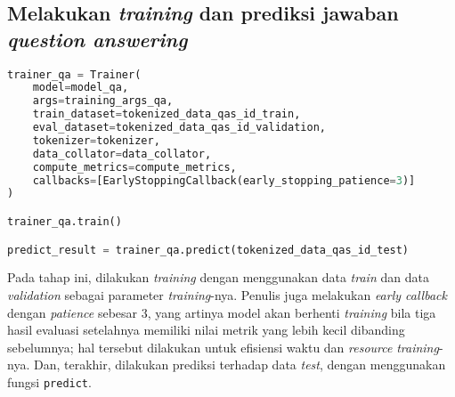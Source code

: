 \subsection{Melakukan \emph{training} dan prediksi jawaban \emph{question answering}}
\begin{lstlisting}[language=Python, caption=Melakukan \emph{training} dan prediksi jawaban \emph{question answering}]
trainer_qa = Trainer(
    model=model_qa,
    args=training_args_qa,
    train_dataset=tokenized_data_qas_id_train,
    eval_dataset=tokenized_data_qas_id_validation,
    tokenizer=tokenizer,
    data_collator=data_collator,
    compute_metrics=compute_metrics,
    callbacks=[EarlyStoppingCallback(early_stopping_patience=3)]
)

trainer_qa.train()

predict_result = trainer_qa.predict(tokenized_data_qas_id_test)
\end{lstlisting}

Pada tahap ini, dilakukan \emph{training} dengan menggunakan data \emph{train} dan data \emph{validation} sebagai parameter \emph{training}-nya. Penulis juga melakukan \emph{early callback} dengan \emph{patience} sebesar 3, yang artinya model akan berhenti \emph{training} bila tiga hasil evaluasi setelahnya memiliki nilai metrik yang lebih kecil dibanding sebelumnya; hal tersebut dilakukan untuk efisiensi waktu dan \emph{resource} \emph{training}-nya. Dan, terakhir, dilakukan prediksi terhadap data \emph{test}, dengan menggunakan fungsi \texttt{predict}.

